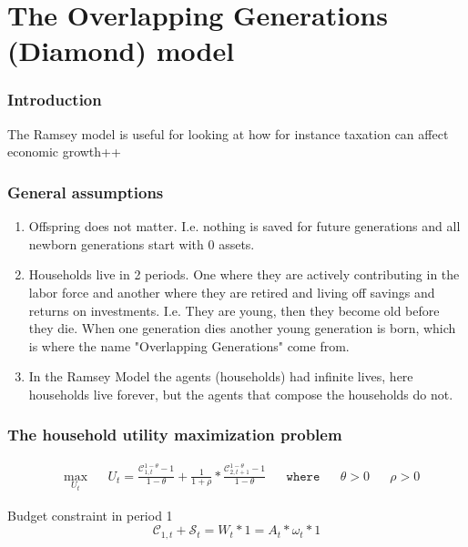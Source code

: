 \section{The Overlapping Generations (Diamond) model}\label{overlapping-generations-model}
\subsubsection{Introduction}
The Ramsey model is useful for looking at how for instance taxation can affect economic growth++
\subsubsection{General assumptions}
\begin{enumerate}
    \item Offspring does not matter. I.e. nothing is saved for future generations and all newborn generations start with 0 assets.
    \item Households live in 2 periods. One where they are actively contributing in the labor force and another where they are retired and living off savings and returns on investments. I.e. They are young, then they become old before they die. When one generation dies another young generation is born, which is where the name "Overlapping Generations" come from. 
    \item In the Ramsey Model the agents (households) had infinite lives, here households live forever, but the agents that compose the households do not. 
    
\end{enumerate}

\subsubsection{The household utility maximization problem}

\begin{equation}
\begin{aligned}
& \underset{U_t}{\max}
& & U_t=\frac{\mathcal{C}_{1,t}^{1-\theta}-1}{1-\theta}+\frac{1}{1+\rho}*\frac{\mathcal{C}_{2, t+1}^{1-\theta}-1}{1-\theta} & &  \texttt{where} & & \theta > 0  & & \rho > 0
\end{aligned}
\end{equation}

Budget constraint in period 1
\begin{equation*}
    \mathcal{C}_{1, t}+\mathcal{S}_t=W_t*1=A_t*\omega_t*1
\end{equation*}

